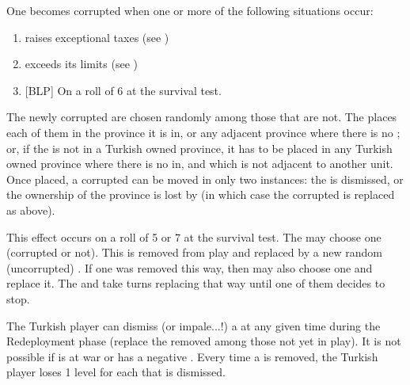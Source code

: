 \aparag[Decadence.] One \Pasha becomes corrupted when one or more of the
following situations occur:
\begin{enumerate}
\item \TUR raises exceptional taxes (see )
\item \TUR exceeds its \MNU limits (see )
\item {[BLP]} On a roll of 6 at the survival test.
\end{enumerate}
\bparag The newly corrupted \Pashas are chosen randomly among those that
are not. The  places each of
them in the province it is in, or any adjacent province where there is
no \Pasha; or, if the \Pasha is not in a Turkish owned province, it has
to be placed in any Turkish owned province where there is no \Pasha in,
and which is not adjacent to another \Pasha unit. Once placed, a
corrupted \Pasha can be moved in only two instances: the \Pasha is
dismissed, or the ownership of the province is lost by \TUR (in which
case the corrupted \Pasha is replaced as above).

 This effect occurs on a roll of 5 or
7 at the survival test.
\bparag The  may choose one
\Pasha (corrupted or not). This \Pasha is removed from play and
replaced by a new random (uncorrupted) \Pasha.
\bparag If one \Pasha was removed this way, then \TUR may also choose
one and replace it.
\bparag The  and \TUR take
turns replacing \Pashas that way until one of them decides to stop.

 The Turkish player can dismiss (or
impale...!) a \Pasha at any given time during the Redeployment phase
(replace the removed \Pasha among those not yet in play). It is not
possible if \TUR is at war or has a negative \STAB.  Every time a \Pasha
is removed, the Turkish player loses 1 \STAB level for each \Pasha that
is dismissed.

